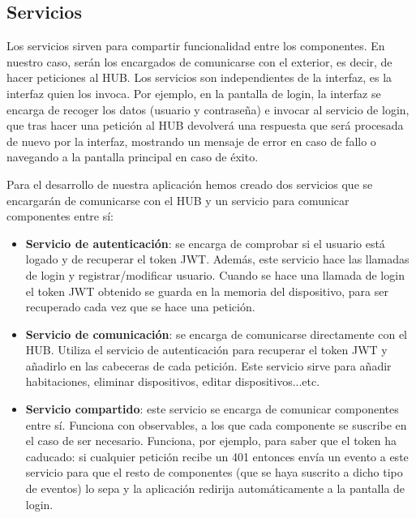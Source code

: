 \subsection{Servicios}
Los servicios sirven para compartir funcionalidad entre los componentes. En nuestro caso, serán los encargados de comunicarse con el exterior, es decir, de hacer peticiones al HUB.
Los servicios son independientes de la interfaz, es la interfaz quien los invoca. Por ejemplo, en la pantalla de login, la interfaz se encarga de recoger los datos (usuario y
contraseña) e invocar al servicio de login, que tras hacer una petición al HUB devolverá una respuesta que será procesada de nuevo por la interfaz, mostrando un mensaje de error en
caso de fallo o navegando a la pantalla principal en caso de éxito.
\par
Para el desarrollo de nuestra aplicación hemos creado dos servicios que se encargarán de comunicarse con el HUB y un servicio para comunicar componentes entre sí:
\begin{itemize}
\item\textbf{Servicio de autenticación}: se encarga de comprobar si el usuario está logado y de recuperar el token JWT. Además, este servicio hace las llamadas de login y registrar/modificar
usuario. Cuando se hace una llamada de login el token JWT obtenido se guarda en la memoria del dispositivo, para ser recuperado cada vez que se hace una petición.
\item\textbf{Servicio de comunicación}: se encarga de comunicarse directamente con el HUB. Utiliza el servicio de autenticación para recuperar el token JWT y añadirlo en las cabeceras de 
cada petición. Este servicio sirve para añadir habitaciones, eliminar dispositivos, editar dispositivos...etc.
\item\textbf{Servicio compartido}: este servicio se encarga de comunicar componentes entre sí. Funciona con observables, a los que cada componente se suscribe en el caso de ser necesario.
Funciona, por ejemplo, para saber que el token ha caducado: si cualquier petición recibe un 401 entonces envía un evento a este servicio para que el resto de componentes (que se haya suscrito
a dicho tipo de eventos) lo sepa y la aplicación redirija automáticamente a la pantalla de login.
\end{itemize}
